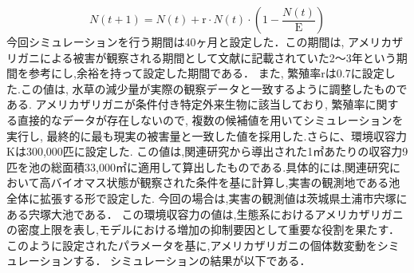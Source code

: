\documentclass[12pt,a4j,titlepage]{ltjsarticle}
\begin{document}
\begin{equation}
  N(t+1) = N(t) + \mathrm{r} \cdot N(t) \cdot \left(1 - \frac{N(t)}{\mathrm{E}}\right)\label{eq:one}
\end{equation}
今回シミュレーションを行う期間は40ヶ月と設定した．この期間は, アメリカザリガニによる被害が観察される期間として文献に記載されていた2～3年という期間を参考にし,余裕を持って設定した期間である．
また, 繁殖率rは0.7に設定した.この値は, 水草の減少量が実際の観察データと一致するように調整したものである. アメリカザリガニが条件付き特定外来生物に該当しており, 繁殖率に関する直接的なデータが存在しないので, 複数の候補値を用いてシミュレーションを実行し, 最終的に最も現実の被害量と一致した値を採用した.さらに、環境収容力Kは300,000匹に設定した.
この値は,関連研究から導出された1㎡あたりの収容力9匹を池の総面積33,000㎡に適用して算出したものである.具体的には,関連研究において高バイオマス状態が観察された条件を基に計算し,実害の観測地である池全体に拡張する形で設定した.
今回の場合は,実害の観測値は茨城県土浦市宍塚にある宍塚大池である．
この環境収容力の値は,生態系におけるアメリカザリガニの密度上限を表し,モデルにおける増加の抑制要因として重要な役割を果たす．このように設定されたパラメータを基に,アメリカザリガニの個体数変動をシミュレーションする．
シミュレーションの結果が以下である．
\end{document}
